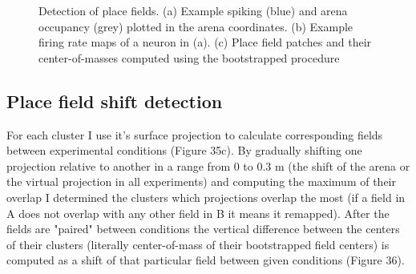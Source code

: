 \begin{figure}
\captionsetup{format=plain}
\caption[Place Field Detection]{
Detection of place fields. (a) Example spiking (blue) and arena occupancy (grey) plotted in the arena coordinates. (b) Example firing rate maps of a neuron in (a). (c) Place field patches and their center-of-masses computed using the bootstrapped procedure
}
\label{fig:F35_place_fields}
\end{figure}


\subsection{Place field shift detection}

For each cluster I use it's surface projection to calculate corresponding fields between experimental conditions (Figure 35c). By gradually shifting one projection relative to another in a range from 0 to 0.3 m (the shift of the arena or the virtual projection in all experiments) and computing the maximum of their overlap I determined the clusters which projections overlap the most (if a field in A does not overlap with any other field in B it means it remapped). After the fields are "paired" between conditions the vertical difference between the centers of their clusters (literally center-of-mass of their bootstrapped field centers) is computed as a shift of that particular field between given conditions (Figure 36).

